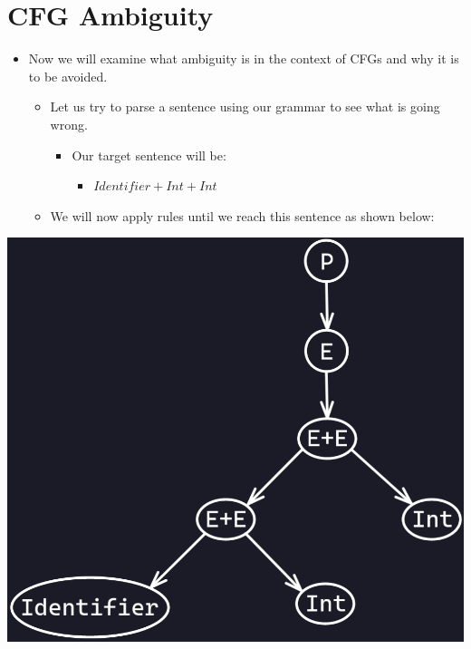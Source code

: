 \documentclass{article}
\begin{document}
\section{CFG Ambiguity}
\begin{itemize}
	\item Now we will examine what ambiguity is in the context of CFGs and why it is to be avoided.
	\begin{itemize}
		\item Let us try to parse a sentence using our grammar to see what is going wrong.
		\begin{itemize}
			\item Our target sentence will be: 
			\begin{itemize}
				\item $Identifier + Int + Int$
			\end{itemize}
		\end{itemize}
		\item We will now apply rules until we reach this sentence as shown below:
	\end{itemize}
\end{itemize}
\begin{center}
	\includegraphics[scale=0.35]{image1.png}
\end{center}
\end{document}
